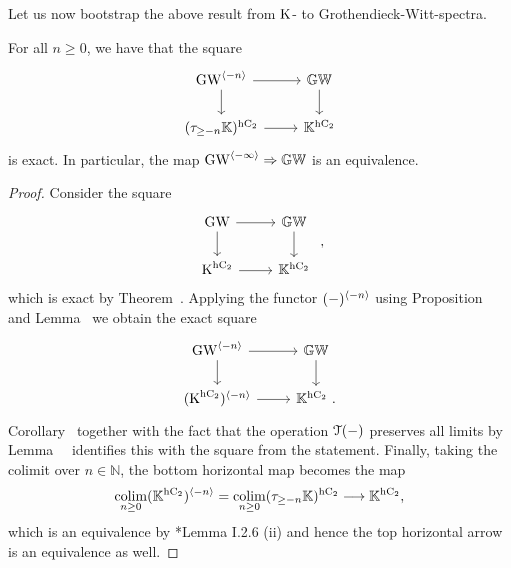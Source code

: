 Let us now bootstrap the above result from $\operatorname K$- to Grothendieck-Witt-spectra. 

\begin{proposition}
\label{proposition:decorated-GW}%
For all $n\geq 0$, we have that the square 
\[
\begin{tikzcd} \GW^{\cotower{-n}} \ar[r] \ar[d] & \KGW \ar[d] \\
(\tau_{\geq -n} \KK)^\hC \ar[r] & \KK^\hC
\end{tikzcd}
\]
is exact. In particular, the map $\operatorname{GW}^{\langle -\infty \rangle} \Rightarrow \mathbb{GW}$ is an equivalence.
\end{proposition}
\begin{proof}
Consider the square
\[
\begin{tikzcd}
\GW \ar[r]\ar[d] & \KGW\ar[d] \\
\K^{\hC} \ar[r] & \KK^{\hC} 
\end{tikzcd} \ ,
\]
which is exact by Theorem~. Applying the functor $(-)^{\langle -n \rangle}$ using Proposition~ and Lemma~\; we obtain the exact square
\[
\begin{tikzcd}
\GW^{\cotower{-n}} \ar[r]\ar[d] & \KGW\ar[d] \\
(\K^{\hC})^{\cotower{-n}} \ar[r] & \KK^{\hC} \ .
\end{tikzcd} 
\]
Corollary~ together with the fact that the operation $\mathcal{T}(-)$ preserves all limits by Lemma~~ identifies this with the square from the statement. Finally, taking the colimit over $n \in \mathbb N$, the bottom horizontal map becomes the map
\[
\mathop{\mathrm{colim}}_{n \geq 0}(\mathbb K^{{\mathrm{h}\mathrm{C_2}}})^{\langle -n \rangle} = \mathop{\mathrm{colim}}_{n \geq 0}(\tau_{\geq -n} \mathbb K)^{{\mathrm{h}\mathrm{C_2}}} \longrightarrow \mathbb K^{{\mathrm{h}\mathrm{C_2}}},
\]
which is an equivalence by \cite{NS}*{Lemma I.2.6 (ii)} and hence the top horizontal arrow is an equivalence as well.
\end{proof}



